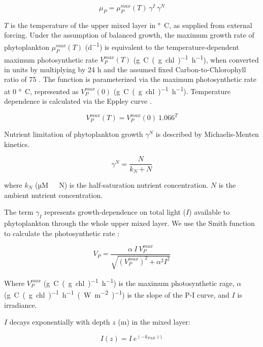 \documentclass[journal abbreviation, manuscript]{copernicus}
\begin{document}
\begin{equation}
    \mu_{P} = \mu_P^{max}(T) \ \gamma^{I} \ \gamma^{N}
\end{equation}

$T$ is the temperature of the upper mixed layer in \unit{\degree C}, as supplied from external forcing. Under the assumption of balanced growth, the maximum growth rate of phytoplankton $\mu_P^{max}(T)$ (\unit{d^{−1}}) is equivalent to the temperature-dependent maximum photosynthetic rate $V_P^{max}(T)$ (\unit{g C (g chl)^{-1} h^{-1}}), when converted in units by multiplying by 24 \unit{h} and the assumed fixed Carbon-to-Chlorophyll ratio of 75 \citet{Sathyendranath2009Carbon-to-chlorophyllSea}. The function is parameterized via the maximum photosynthetic rate at 0 \unit{\degree C}, represented as $V_P^{max}(0)$ (\unit{g C (g chl)^{-1} h^{-1}}). Temperature dependence is calculated via the Eppley curve \citep{Eppley1972TemperatureSea}.

\begin{equation}
    V_P^{max}(T) = V_P^{max}(0) \ 1.066^T
\end{equation}

Nutrient limitation of phytoplankton growth $\gamma^N$ is described by Michaelis-Menten kinetics.

\begin{equation}
    \gamma^N = \frac{N}{k_N + N}
\end{equation}

where $k_N$ (\unit{µM \ N}) is the half-saturation nutrient concentration. $N$ is the ambient nutrient concentration.

The term $\gamma_{I}$ represents growth-dependence on total light ($I$) available to phytoplankton through the whole upper mixed layer. We use the Smith function to calculate the photosynthetic rate \citep{Anderson1993APhotosynthesis}:

\begin{equation}
    V_P = \frac{\alpha ~ I ~ V_P^{max}}{\sqrt{(V_P^{max})^2 + \alpha^2 I^2}}
\end{equation}

Where $V_P^{max}$ (\unit{g C (g chl)^{-1} h^{-1}}) is the maximum photosynthetic rage, $\alpha$ (\unit{g C (g chl)^{-1} h^{-1} (W m^{-2})^{-1}}) is the slope of the P-I curve, and $I$ is irradiance.

$I$ decays exponentially with depth $z$ (\unit{m}) in the mixed layer:

\begin{equation}
    I(z) = I \ e^{(-k_{PAR} \ z)}
\end{equation}
\end{document}
